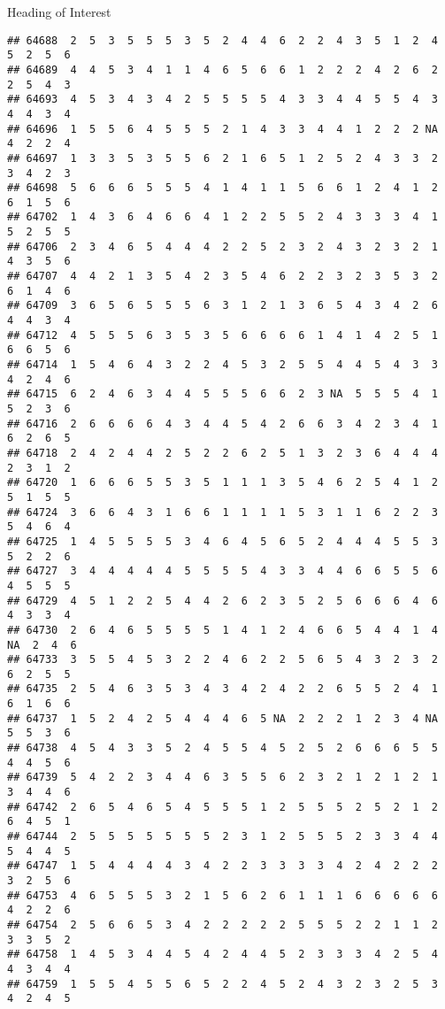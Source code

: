 \documentclass[
  ignorenonframetext,
]{beamer}
\begin{document}
\begin{frame}[fragile]{Heading of Interest}
\begin{verbatim}
## 64688  2  5  3  5  5  5  3  5  2  4  4  6  2  2  4  3  5  1  2  4  5  2  5  6
## 64689  4  4  5  3  4  1  1  4  6  5  6  6  1  2  2  2  4  2  6  2  2  5  4  3
## 64693  4  5  3  4  3  4  2  5  5  5  5  4  3  3  4  4  5  5  4  3  4  4  3  4
## 64696  1  5  5  6  4  5  5  5  2  1  4  3  3  4  4  1  2  2  2 NA  4  2  2  4
## 64697  1  3  3  5  3  5  5  6  2  1  6  5  1  2  5  2  4  3  3  2  3  4  2  3
## 64698  5  6  6  6  5  5  5  4  1  4  1  1  5  6  6  1  2  4  1  2  6  1  5  6
## 64702  1  4  3  6  4  6  6  4  1  2  2  5  5  2  4  3  3  3  4  1  5  2  5  5
## 64706  2  3  4  6  5  4  4  4  2  2  5  2  3  2  4  3  2  3  2  1  4  3  5  6
## 64707  4  4  2  1  3  5  4  2  3  5  4  6  2  2  3  2  3  5  3  2  6  1  4  6
## 64709  3  6  5  6  5  5  5  6  3  1  2  1  3  6  5  4  3  4  2  6  4  4  3  4
## 64712  4  5  5  5  6  3  5  3  5  6  6  6  6  1  4  1  4  2  5  1  6  6  5  6
## 64714  1  5  4  6  4  3  2  2  4  5  3  2  5  5  4  4  5  4  3  3  4  2  4  6
## 64715  6  2  4  6  3  4  4  5  5  5  6  6  2  3 NA  5  5  5  4  1  5  2  3  6
## 64716  2  6  6  6  6  4  3  4  4  5  4  2  6  6  3  4  2  3  4  1  6  2  6  5
## 64718  2  4  2  4  4  2  5  2  2  6  2  5  1  3  2  3  6  4  4  4  2  3  1  2
## 64720  1  6  6  6  5  5  3  5  1  1  1  3  5  4  6  2  5  4  1  2  5  1  5  5
## 64724  3  6  6  4  3  1  6  6  1  1  1  1  5  3  1  1  6  2  2  3  5  4  6  4
## 64725  1  4  5  5  5  5  3  4  6  4  5  6  5  2  4  4  4  5  5  3  5  2  2  6
## 64727  3  4  4  4  4  4  5  5  5  5  4  3  3  4  4  6  6  5  5  6  4  5  5  5
## 64729  4  5  1  2  2  5  4  4  2  6  2  3  5  2  5  6  6  6  4  6  4  3  3  4
## 64730  2  6  4  6  5  5  5  5  1  4  1  2  4  6  6  5  4  4  1  4 NA  2  4  6
## 64733  3  5  5  4  5  3  2  2  4  6  2  2  5  6  5  4  3  2  3  2  6  2  5  5
## 64735  2  5  4  6  3  5  3  4  3  4  2  4  2  2  6  5  5  2  4  1  6  1  6  6
## 64737  1  5  2  4  2  5  4  4  4  6  5 NA  2  2  2  1  2  3  4 NA  5  5  3  6
## 64738  4  5  4  3  3  5  2  4  5  5  4  5  2  5  2  6  6  6  5  5  4  4  5  6
## 64739  5  4  2  2  3  4  4  6  3  5  5  6  2  3  2  1  2  1  2  1  3  4  4  6
## 64742  2  6  5  4  6  5  4  5  5  5  1  2  5  5  5  2  5  2  1  2  6  4  5  1
## 64744  2  5  5  5  5  5  5  5  2  3  1  2  5  5  5  2  3  3  4  4  5  4  4  5
## 64747  1  5  4  4  4  4  3  4  2  2  3  3  3  3  4  2  4  2  2  2  3  2  5  6
## 64753  4  6  5  5  5  3  2  1  5  6  2  6  1  1  1  6  6  6  6  6  4  2  2  6
## 64754  2  5  6  6  5  3  4  2  2  2  2  2  5  5  5  2  2  1  1  2  3  3  5  2
## 64758  1  4  5  3  4  4  5  4  2  4  4  5  2  3  3  3  4  2  5  4  4  3  4  4
## 64759  1  5  5  4  5  5  6  5  2  2  4  5  2  4  3  2  3  2  5  3  4  2  4  5

\end{verbatim}
\end{frame}
\end{document}
